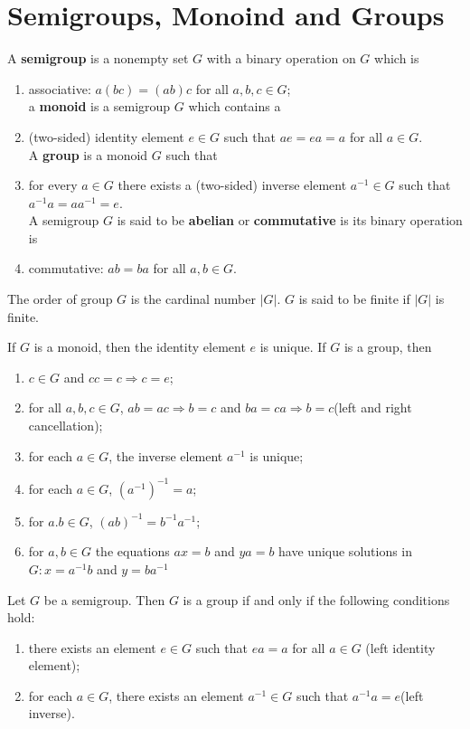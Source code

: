 \section{Semigroups, Monoind and Groups}
\begin{definition}
    A \textbf{semigroup} is a nonempty set $G$ with a binary operation on $G$ which is 
    \begin{enumerate}[i]
        \item associative: $a(bc)=(ab)c$ for all $a,b,c\in G$;\\ a \textbf{monoid} is a semigroup $G$ which contains a
        \item (two-sided) identity element $e\in G$ such that $ae=ea=a$ for all $a\in G$.\\ A \textbf{group} is a monoid $G$ such that 
        \item for every $a\in G$ there exists a (two-sided) inverse element $a^{-1}\in G$ such that $a^{-1}a=aa^{-1}=e$.\\ A semigroup $G$ is said to be \textbf{abelian} or \textbf{commutative} is its binary operation is 
        \item commutative: $ab=ba$ for all $a,b\in G$.
    \end{enumerate}
    The order of group $G$ is the cardinal number $\left| G \right| $. $G$ is said to be finite if $\left| G \right| $ is finite.
\end{definition}

\begin{theorem}
    If $G$ is a monoid, then the identity element $e$ is unique. If $G$ is a group, then
    \begin{enumerate}[i]
        \item $c\in G$ and $cc=c\Rightarrow c=e$;
        \item for all $a,b,c\in G$, $ab=ac\Rightarrow b=c$ and $ba=ca\Rightarrow b=c$(left and right cancellation);
        \item for each $a\in G$, the inverse element $a^{-1}$ is unique;
        \item for each $a\in G$, $(a^{-1})^{-1}=a$;
        \item for $a.b\in G$, $(ab)^{-1}=b^{-1}a^{-1}$;
        \item for $a,b\in G$ the equations $ax=b$ and $ya=b$ have unique solutions in $G:x=a^{-1}b$ and $y=ba^{-1}$
    \end{enumerate}
\end{theorem}

\begin{proposition}
    Let $G$ be a semigroup. Then $G$ is a group if and only if the following conditions hold:
    \begin{enumerate}
        \item there exists an element $e\in G$ such that $ea = a$ for all $a \in G$ (left identity
        element);
        \item for each $a\in G$, there exists an element $a^{-1}\in G$ such that $a^{-1}a=e$(left inverse).
    \end{enumerate}
\end{proposition}

